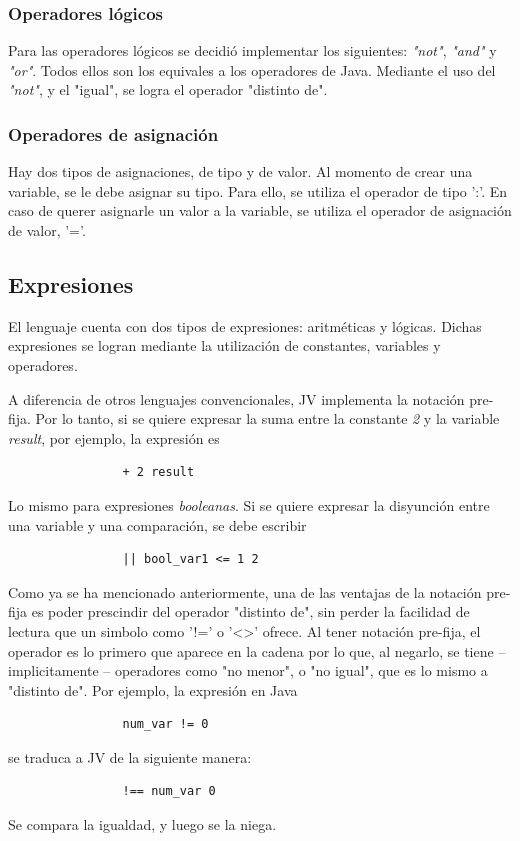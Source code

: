 \documentclass{article}
\begin{document}
            \subsubsection{Operadores lógicos}
                \par Para las operadores lógicos se decidió implementar los siguientes: \textit{"not"}, \textit{"and"} y \textit{"or"}. Todos ellos son los equivales a los operadores de Java. Mediante el uso del \textit{"not"}, y el "igual", se logra el operador "distinto de".
            \subsubsection{Operadores de asignación}
                \par Hay dos tipos de asignaciones, de tipo y de valor. Al momento de crear una variable, se le debe asignar su tipo. Para ello, se utiliza el operador de tipo ':'. En caso de querer asignarle un valor a la variable, se utiliza el operador de asignación de valor, '='. 
        \\

        \subsection{Expresiones}
            \par El lenguaje cuenta con dos tipos de expresiones: aritméticas y lógicas. Dichas expresiones se logran mediante la utilización de constantes, variables y operadores.
            \par A diferencia de otros lenguajes convencionales, JV implementa la notación pre-fija. Por lo tanto, si se quiere expresar la suma entre la constante \textit{2} y la variable \textit{result}, por ejemplo, la expresión es
            \begin{lstlisting}
                + 2 result
            \end{lstlisting}
            Lo mismo para expresiones \textit{booleanas}. Si se quiere expresar la disyunción entre una variable y una comparación, se debe escribir 
            \begin{lstlisting}
                || bool_var1 <= 1 2
            \end{lstlisting}
            \par Como ya se ha mencionado anteriormente, una de las ventajas de la notación pre-fija es poder prescindir del operador "distinto de", sin perder la facilidad de lectura que un simbolo como '!=' o '<>' ofrece. Al tener notación pre-fija, el operador es lo primero que aparece en la cadena por lo que, al negarlo, se tiene – implicitamente – operadores como "no menor", o "no igual", que es lo mismo a "distinto de". Por ejemplo, la expresión en Java
            \begin{lstlisting}
                num_var != 0
            \end{lstlisting}
            se traduca a JV de la siguiente manera:
            \begin{lstlisting}
                !== num_var 0
            \end{lstlisting}
            Se compara la igualdad, y luego se la niega.  
        
\end{document}
